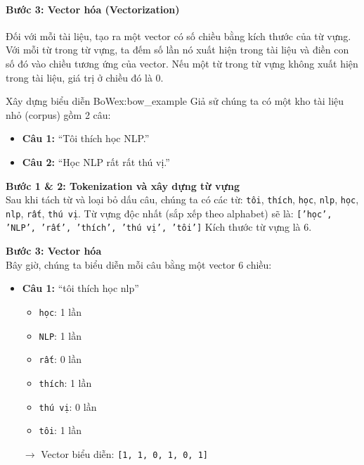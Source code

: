 \paragraph{Bước 3: Vector hóa (Vectorization)}
Đối với mỗi tài liệu, tạo ra một vector có số chiều bằng kích thước của từ vựng. Với mỗi từ trong từ vựng, ta đếm số lần nó xuất hiện trong tài liệu và điền con số đó vào chiều tương ứng của vector. Nếu một từ trong từ vựng không xuất hiện trong tài liệu, giá trị ở chiều đó là 0.

\begin{example}{Xây dựng biểu diễn BoW}{ex:bow_example}
    Giả sử chúng ta có một kho tài liệu nhỏ (corpus) gồm 2 câu:
    \begin{itemize}
        \item \textbf{Câu 1:} “Tôi thích học NLP.”
        \item \textbf{Câu 2:} “Học NLP rất rất thú vị.”
    \end{itemize}

    \textbf{Bước 1 \& 2: Tokenization và xây dựng từ vựng} \\
    Sau khi tách từ và loại bỏ dấu câu, chúng ta có các từ: \texttt{tôi}, \texttt{thích}, \texttt{học}, \texttt{nlp}, \texttt{học}, \texttt{nlp}, \texttt{rất}, \texttt{thú vị}.
    Từ vựng độc nhất (sắp xếp theo alphabet) sẽ là:
    \texttt{['học', 'NLP', 'rất', 'thích', 'thú vị', 'tôi']}
    Kích thước từ vựng là 6.

    \textbf{Bước 3: Vector hóa} \\
    Bây giờ, chúng ta biểu diễn mỗi câu bằng một vector 6 chiều:
    \begin{itemize}
        \item \textbf{Câu 1:} “tôi thích học nlp”
            \begin{itemize}
                \item \texttt{học}: 1 lần
                \item \texttt{NLP}: 1 lần
                \item \texttt{rất}: 0 lần
                \item \texttt{thích}: 1 lần
                \item \texttt{thú vị}: 0 lần
                \item \texttt{tôi}: 1 lần
            \end{itemize}
            \(\rightarrow\) Vector biểu diễn: \texttt{[1, 1, 0, 1, 0, 1]}


\end{itemize}
\end{example}

